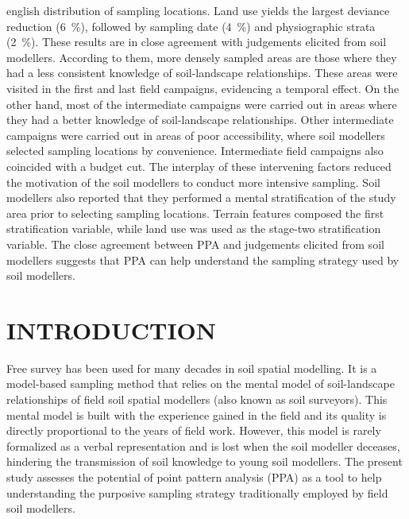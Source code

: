\begin{chapterabstract}{english}{\enkeys}
distribution of sampling locations. Land use yields the largest deviance reduction (\SI{6}{\percent}), followed
by sampling date (\SI{4}{\percent}) and physiographic strata (\SI{2}{\percent}). These results are in close 
agreement with judgements elicited from soil modellers. According to them, more densely sampled areas are those 
where they had a less consistent knowledge of soil-landscape relationships. These areas were visited in the 
first and last field campaigns, evidencing a temporal effect. On the other hand, most of the intermediate 
campaigns were carried out in areas where they had a better knowledge of soil-landscape relationships. Other 
intermediate campaigns were carried out in areas of poor accessibility, where soil modellers selected sampling 
locations by convenience. Intermediate field campaigns also coincided with a budget cut. The interplay of these 
intervening factors reduced the motivation of the soil modellers to conduct more intensive sampling. Soil 
modellers also reported that they performed a mental stratification of the study area prior to selecting 
sampling locations. Terrain features composed the first stratification variable, while land use was used as the 
stage-two stratification variable. The close agreement between PPA and judgements elicited from soil modellers 
suggests that PPA can help understand the sampling strategy used by soil modellers.
\end{chapterabstract}

\formatchapter

\section{INTRODUCTION}


Free survey has been used for many decades in soil spatial modelling. It is a model-based sampling method that 
relies on the mental model of soil-landscape relationships of field soil spatial modellers (also known as 
soil surveyors). This mental model is built with the experience gained in the field and its quality is directly 
proportional to the years of field work. However, this model is rarely formalized as a verbal representation 
and is lost when the soil modeller deceases, hindering the transmission of soil knowledge to young soil 
modellers. The present study assesses the potential of point pattern analysis (PPA) as a tool to help 
understanding the purposive sampling strategy traditionally employed by field soil modellers.

